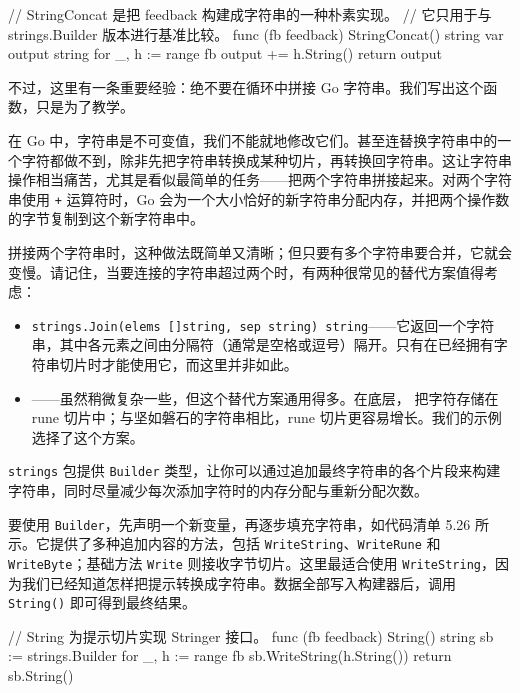 \begin{gocode}[title={代码清单 5.25 构建字符串的朴素实现}]
// StringConcat 是把 feedback 构建成字符串的一种朴素实现。
// 它只用于与 strings.Builder 版本进行基准比较。
func (fb feedback) StringConcat() string {
    var output string
    for _, h := range fb {
        output += h.String()
    }
    return output
}
\end{gocode}

不过，这里有一条重要经验：绝不要在循环中拼接 Go 字符串。我们写出这个函数，只是为了教学。

在 Go 中，字符串是不可变值，我们不能就地修改它们。甚至连替换字符串中的一个字符都做不到，除非先把字符串转换成某种切片，再转换回字符串。这让字符串操作相当痛苦，尤其是看似最简单的任务——把两个字符串拼接起来。对两个字符串使用 \texttt{+} 运算符时，Go 会为一个大小恰好的新字符串分配内存，并把两个操作数的字节复制到这个新字符串中。

拼接两个字符串时，这种做法既简单又清晰；但只要有多个字符串要合并，它就会变慢。请记住，当要连接的字符串超过两个时，有两种很常见的替代方案值得考虑：

\begin{itemize}
  \item \texttt{strings.Join(elems []string, sep string) string}——它返回一个字符串，其中各元素之间由分隔符（通常是空格或逗号）隔开。只有在已经拥有字符串切片时才能使用它，而这里并非如此。
  \item {}——虽然稍微复杂一些，但这个替代方案通用得多。在底层， 把字符存储在 rune 切片中；与坚如磐石的字符串相比，rune 切片更容易增长。我们的示例选择了这个方案。
\end{itemize}

\texttt{strings} 包提供 \texttt{Builder} 类型，让你可以通过追加最终字符串的各个片段来构建字符串，同时尽量减少每次添加字符时的内存分配与重新分配次数。

要使用 \texttt{Builder}，先声明一个新变量，再逐步填充字符串，如代码清单 5.26 所示。它提供了多种追加内容的方法，包括 \texttt{WriteString}、\texttt{WriteRune} 和 \texttt{WriteByte}；基础方法 \texttt{Write} 则接收字节切片。这里最适合使用 \texttt{WriteString}，因为我们已经知道怎样把提示转换成字符串。数据全部写入构建器后，调用 \texttt{String()} 即可得到最终结果。

\begin{gocode}[title={代码清单 5.26 \texttt{hint.go}：\texttt{feedback} 类型上的 \texttt{String()}}]
// String 为提示切片实现 Stringer 接口。
func (fb feedback) String() string {
    sb := strings.Builder{}
    for _, h := range fb {
        sb.WriteString(h.String())
    }
    return sb.String()
}
\end{gocode}


